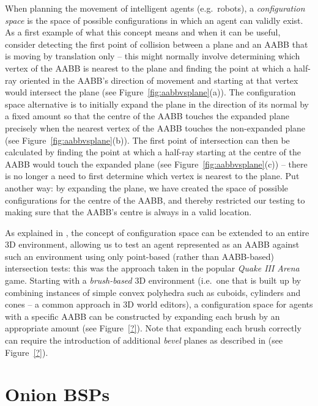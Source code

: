 \documentclass[10pt,twocolumn]{article}
\begin{document}
When planning the movement of intelligent agents (e.g.~robots), a \emph{configuration space} is the space of possible configurations in which an agent can validly exist. As a first example of what this concept means and when it can be useful, consider detecting the first point of collision between a plane and an AABB that is moving by translation only -- this might normally involve determining which vertex of the AABB is nearest to the plane and finding the point at which a half-ray oriented in the AABB's direction of movement and starting at that vertex would intersect the plane (see Figure~\ref{fig:aabbvsplane}(a)). The configuration space alternative is to initially expand the plane in the direction of its normal by a fixed amount so that the centre of the AABB touches the expanded plane precisely when the nearest vertex of the AABB touches the non-expanded plane (see Figure~\ref{fig:aabbvsplane}(b)). The first point of intersection can then be calculated by finding the point at which a half-ray starting at the centre of the AABB would touch the expanded plane (see Figure~\ref{fig:aabbvsplane}(c)) -- there is no longer a need to first determine which vertex is nearest to the plane. Put another way: by expanding the plane, we have created the space of possible configurations for the centre of the AABB, and thereby restricted our testing to making sure that the AABB's centre is always in a valid location.

As explained in \cite{vanwaveren01}, the concept of configuration space can be extended to an entire 3D environment, allowing us to test an agent represented as an AABB against such an environment using only point-based (rather than AABB-based) intersection tests: this was the approach taken in the popular \emph{Quake III Arena} game. Starting with a \emph{brush-based} 3D environment (i.e.~one that is built up by combining instances of simple convex polyhedra such as cuboids, cylinders and cones -- a common approach in 3D world editors), a configuration space for agents with a specific AABB can be constructed by expanding each brush by an appropriate amount (see Figure~\ref{?}). Note that expanding each brush correctly can require the introduction of additional \emph{bevel} planes as described in \cite{vanwaveren01} (see Figure~\ref{?}).

\iffalse

\section{Onion BSPs}
\label{sec:onionbsp}
\end{document}
